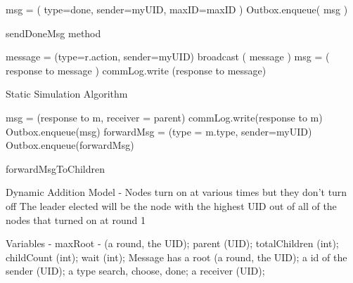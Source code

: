 \documentclass[english]{article}
\begin{document}
\begin{algorithm} [sendDoneMsg]
  msg = ( type=done, sender=myUID, maxID=maxID ) \;
  Outbox.enqueue( msg ) \;
  \caption{sendDoneMsg method}
\end{algorithm}

\begin{algorithm} 
   {
     {
      message = (type=r.action, sender=myUID) \;
      broadcast ( message ) \;
      msg = ( response to message ) \;
      commLog.write (response to message) \;
    }
  }
  \caption{Static Simulation Algorithm}
\end{algorithm}

\begin{algorithm} [forwardMsgToChildren]
  msg = (response to m, receiver = parent) \;
  commLog.write(response to m) \;
   {
    Outbox.enqueue(msg) \;
  } { %
    forwardMsg = (type = m.type, sender=myUID) \;
    Outbox.enqueue(forwardMsg) \;
  }
  \caption{forwardMsgToChildren}
\end{algorithm}




Dynamic Addition Model - Nodes turn on at various times but they don't turn off 
The leader elected will be the node with the highest UID out of all of the nodes that turned on at round 1

Variables - maxRoot - (a round, the UID); parent (UID); totalChildren (int); childCount (int); wait (int);
Message has a root (a round, the UID); a id of the sender (UID); a type {search, choose, done}; a receiver (UID);
\end{document}
